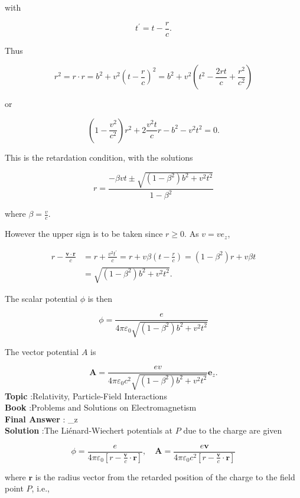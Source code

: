 \documentclass[10pt]{article}
\begin{document}
with

$$
t^{\prime}=t-\frac{r}{c} .
$$

Thus

$$
r^{2}=r \cdot r=b^{2}+v^{2}\left(t-\frac{r}{c}\right)^{2}=b^{2}+v^{2}\left(t^{2}-\frac{2 r t}{c}+\frac{r^{2}}{c^{2}}\right)
$$

or

$$
\left(1-\frac{v^{2}}{c^{2}}\right) r^{2}+2 \frac{v^{2} t}{c} r-b^{2}-v^{2} t^{2}=0 .
$$

This is the retardation condition, with the solutions

$$
r=\frac{-\beta v t \pm \sqrt{\left(1-\beta^{2}\right) b^{2}+v^{2} t^{2}}}{1-\beta^{2}}
$$

where $\beta=\frac{v}{c}$.

However the upper sign is to be taken since $r \geq 0$. As $v=v e_{z}$,

$$
\begin{aligned}
r-\frac{\mathbf{v} \cdot \mathbf{r}}{c} &=r+\frac{v^{2} t^{\prime}}{c}=r+v \beta\left(t-\frac{r}{c}\right)=\left(1-\beta^{2}\right) r+v \beta t \\
&=\sqrt{\left(1-\beta^{2}\right) b^{2}+v^{2} t^{2}} .
\end{aligned}
$$

The scalar potential $\phi$ is then

$$
\phi=\frac{e}{4 \pi \varepsilon_{0} \sqrt{\left(1-\beta^{2}\right) b^{2}+v^{2} t^{2}}}
$$

 The vector potential $A$ is

$$
\mathbf{A}=\frac{e v}{4 \pi \varepsilon_{0} c^{2} \sqrt{\left(1-\beta^{2}\right) b^{2}+v^{2} t^{2}}} \mathbf{e}_{z} .
$$
\textbf{Topic} :Relativity, Particle-Field Interactions\\
\textbf{Book} :Problems and Solutions on Electromagnetism\\
\textbf{Final Answer} : _{z}\\


\textbf{Solution} :The Liénard-Wiechert potentials at $P$ due to the charge are given

$$
\phi=\frac{e}{4 \pi \varepsilon_{0}\left[r-\frac{\mathbf{v}}{c} \cdot \mathbf{r}\right]}, \quad \mathbf{A}=\frac{e \mathbf{v}}{4 \pi \varepsilon_{0} c^{2}\left[r-\frac{\mathbf{v}}{c} \cdot \mathbf{r}\right]}
$$

where $\mathbf{r}$ is the radius vector from the retarded position of the charge to the field point $P$, i.e.,
\end{document}

